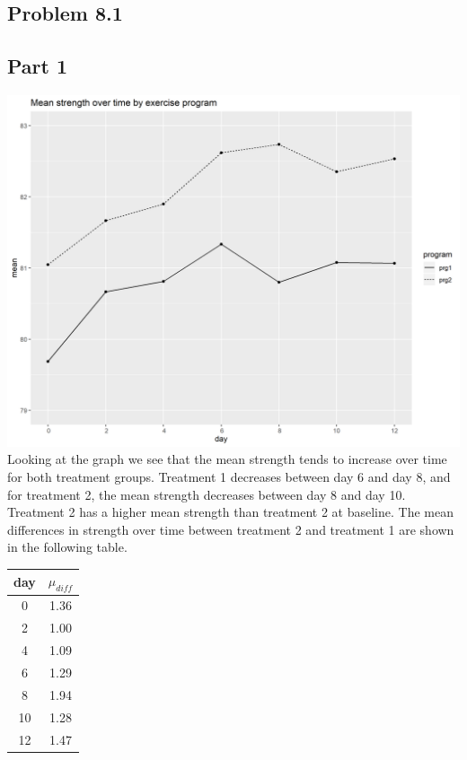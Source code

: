 \documentclass{article}
\begin{document}
\begin{flushleft}

\section*{Problem 8.1}
\subsection*{Part 1}
\includegraphics[scale=.4]{meanplot.png}\\
Looking at the graph we see that the mean strength tends to increase over time for both treatment groups. Treatment 1 decreases between day 6 and day 8, and for treatment 2, the mean strength decreases between day 8 and day 10. Treatment 2 has a higher mean strength than treatment 2 at baseline. The mean differences in strength over time between treatment 2 and treatment 1 are shown in the following table.\\
\begin{tabular}{cc}
	\hline
	day & $\mu_{diff}$ \\ 
	\hline
	0 & 1.36 \\ 
	2 & 1.00 \\ 
	4 & 1.09 \\ 
	6 & 1.29 \\ 
	8 & 1.94 \\ 
	10 & 1.28 \\ 
	12 & 1.47 \\ 
	\hline
\end{tabular}

\end{flushleft}
\end{document}
